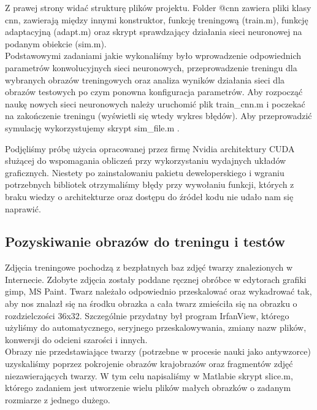 \documentclass[11pt,a4paper]{article}
\begin{document}
Z prawej strony widać strukturę plików projektu. Folder @cnn zawiera pliki klasy cnn, zawierają między innymi konstruktor, funkcję treningową (train.m), funkcję adaptacyjną (adapt.m) oraz skrypt sprawdzający działania sieci neuronowej na podanym obiekcie (sim.m).\\
\indent
 Podstawowymi zadaniami jakie wykonaliśmy było wprowadzenie odpowiednich parametrów konwolucyjnych sieci neuronowych, przeprowadzenie treningu dla wybranych obrazów treningowych oraz analiza wyników działania sieci dla obrazów testowych po czym ponowna konfiguracja parametrów.
Aby rozpocząć naukę nowych sieci neuronowych należy uruchomić plik train\_cnn.m i poczekać na zakończenie treningu (wyświetli się wtedy wykres błędów). Aby przeprowadzić symulację wykorzystujemy skrypt sim\_file.m .

Podjęliśmy próbę użycia opracowanej przez firmę Nvidia architektury CUDA służącej do wspomagania obliczeń przy wykorzystaniu wydajnych układów graficznych. Niestety po zainstalowaniu pakietu deweloperskiego i wgraniu potrzebnych bibliotek otrzymaliśmy błędy przy wywołaniu funkcji, których z braku wiedzy o architekturze oraz dostępu do źródeł kodu nie udało nam się naprawić.
  

\subsection{Pozyskiwanie obrazów do treningu i testów}
Zdjęcia treningowe pochodzą z bezpłatnych baz zdjęć twarzy znalezionych w Internecie. Zdobyte zdjęcia zostały poddane ręcznej obróbce w edytorach grafiki gimp, MS Paint. Twarz należało odpowiednio przeskalować oraz wykadrować tak, aby nos znalazł się na środku obrazka a cała twarz zmieściła się na obrazku o rozdzielczości 36x32.  Szczególnie przydatny był program IrfanView, którego użyliśmy do automatycznego, seryjnego przeskalowywania, zmiany nazw plików, konwersji do odcieni szarości i innych.\\
\indent
Obrazy nie przedstawiające twarzy (potrzebne w procesie nauki jako antywzorce) uzyskaliśmy poprzez pokrojenie obrazów krajobrazów oraz fragmentów zdjęć niezawierających twarzy. W tym celu napisaliśmy w Matlabie skrypt slice.m, którego zadaniem jest utworzenie wielu plików małych obrazków o zadanym rozmiarze z jednego dużego.
\end{document}
